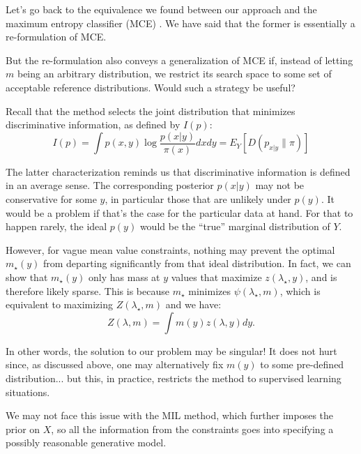 \documentclass[english]{scrartcl}
\begin{document}
Let's go back to the equivalence we found between our approach and the
maximum entropy classifier (MCE) \cite{BergerA-96}. We have said that
the former is essentially a re-formulation of MCE.

But the re-formulation also conveys a generalization of MCE if,
instead of letting $m$ being an arbitrary distribution, we restrict
its search space to some set of acceptable reference
distributions. Would such a strategy be useful? 

Recall that the method selects the joint distribution that minimizes
discriminative information, as defined by $I(p)$:
$$
I(p) 
= \int p(x,y)\log\frac{p(x|y)}{\pi(x)} dxdy
= E_Y[D(p_{x|y}\|\pi)]
$$

The latter characterization reminds us that discriminative information
is defined in an average sense. The corresponding posterior $p(x|y)$
may not be conservative for some $y$, in particular those that are
unlikely under $p(y)$. It would be a problem if that's the case for
the particular data at hand. For that to happen rarely, the ideal
$p(y)$ would be the ``true'' marginal distribution of $Y$.

However, for vague mean value constraints, nothing may prevent the
optimal $m_\star(y)$ from departing significantly from that ideal
distribution. In fact, we can show that $m_\star(y)$ only has mass at
$y$ values that maximize $z(\lambda_\star,y)$, and is therefore likely
sparse. This is because $m_\star$ minimizes $\psi(\lambda_\star,m)$,
which is equivalent to maximizing $Z(\lambda_\star,m)$ and we have:
$$
Z(\lambda, m) = \int m(y) z(\lambda, y) dy.
$$

In other words, the solution to our problem may be singular! It does
not hurt since, as discussed above, one may alternatively fix $m(y)$
to some pre-defined distribution... but this, in practice, restricts
the method to supervised learning situations.

We may not face this issue with the MIL method, which further imposes
the prior on $X$, so all the information from the constraints goes
into specifying a possibly reasonable generative model.






\end{document}
